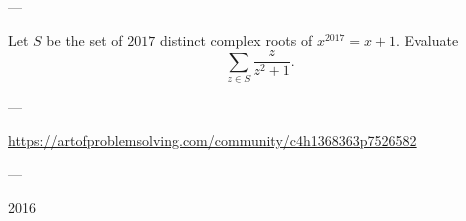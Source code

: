 
---

Let $S$ be the set of $2017$ distinct complex roots of $x^{2017}=x+1$. Evaluate \[\sum_{z\in S}\frac z{z^2+1}.\]

---

\url{https://artofproblemsolving.com/community/c4h1368363p7526582}

---

2016
